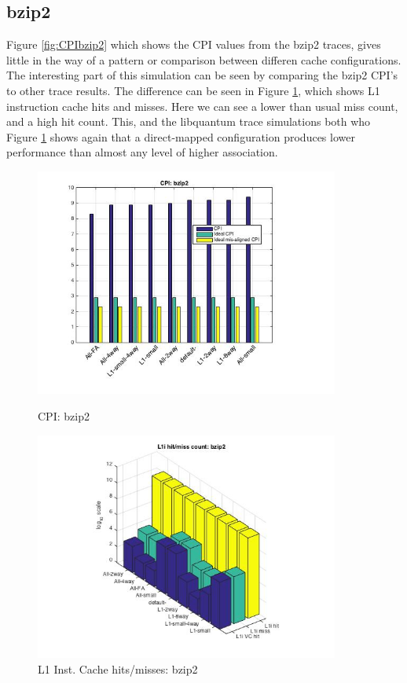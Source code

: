 \documentclass[11pt,titlepage]{article}
\begin{document}
    \subsection{bzip2}
    Figure \ref{fig:CPIbzip2} which shows the CPI values from the bzip2 traces, gives little in the way of a pattern or comparison between differen cache configurations. The interesting part of this simulation can be seen by comparing the bzip2 CPI's to other trace results. The difference can be seen in Figure \ref{fig:L1IHM_bzip2}, which shows L1 instruction cache hits and misses. Here we can see a lower than usual miss count, and a high hit count. This, and the libquantum trace simulations both who Figure \ref{fig:L1IHM_bzip2} shows again that a direct-mapped configuration produces lower performance than almost any level of higher association. 
        \begin{figure}[H]
          \centering
          \begin{minipage}{.5\textwidth}
            \centering
            \includegraphics[width=10cm]{CPIbzip2}
            \caption{CPI: bzip2}
            \label{fig:CPIbzip2}
          \end{minipage}%
          \begin{minipage}{.5\textwidth}
            \centering
            \includegraphics[width=10cm]{L1IHM_bzip2}
            \caption{L1 Inst. Cache hits/misses: bzip2}
            \label{fig:L1IHM_bzip2}
          \end{minipage}%
        \end{figure}
\end{document}
